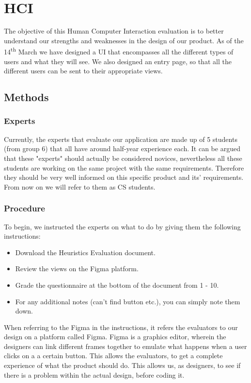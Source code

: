 \documentclass{article}
\begin{document}
\section{HCI}
The objective of this Human Computer Interaction evaluation is to better understand our strengths and weaknesses in the design of our product.
As of the 14\textsuperscript{th} March we have designed a UI that encompasses all the different types of users and what they will see.
We also designed an entry page, so that all the different users can be sent to their appropriate views.\\

\subsection{Methods}
\subsubsection{Experts}
Currently, the experts that evaluate our application are made up of 5 students (from group 6) that all have around half-year experience each.
It can be argued that these "experts" should actually be considered novices, nevertheless all these students are working on the same project with the same requirements.
Therefore they should be very well informed on this specific product and its' requirements.
From now on we will refer to them as CS students.\\

\subsubsection{Procedure}
To begin, we instructed the experts on what to do by giving them the following instructions:
\begin{itemize}
    \item Download the Heuristics Evaluation document.
    \item Review the views on the Figma platform.
    \item Grade the questionnaire at the bottom of the document from 1 - 10.
    \item For any additional notes (can't find button etc.), you can simply note them down.
\end{itemize}
When referring to the Figma in the instructions, it refers the evaluators to our design on a platform called Figma.
Figma is a graphics editor, wherein the designers can link different frames together to emulate what happens when a user clicks on a a certain button.
This allows the evaluators, to get a complete experience of what the product should do.
This allows us, as designers, to see if there is a problem within the actual design, before coding it.\\
\end{document}
